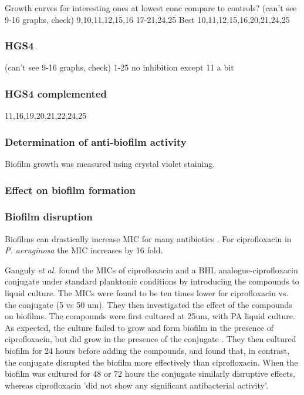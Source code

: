 Growth curves for interesting ones at lowest conc compare to controls?
(can't see 9-16 graphs, check)
9,10,11,12,15,16
17-21,24,25
Best 10,11,12,15,16,20,21,24,25

\subsubsection{HGS4}
(can't see 9-16 graphs, check)
1-25 no inhibition
except 11 a bit


\subsubsection{HGS4 complemented}

11,16,19,20,21,22,24,25

\subsubsection{Determination of anti-biofilm activity}

Biofilm growth was measured using crystal violet staining\cite{OToole1998}.

\subsubsection{Effect on biofilm formation}





\subsubsection{Biofilm disruption}



Biofilms can drastically increase MIC for many antibiotics \cite{Ceri1999}. For ciprofloxacin in \textit{P. aeruginosa} the MIC increases by 16 fold. 

Ganguly \textit{et al.} \cite{Ganguly2011} found the MICs of ciprofloxacin and a BHL analogue-ciprofloxacin  conjugate under standard planktonic conditions by introducing the compounds to liquid culture. The MICs were found to be ten times lower for ciprofloxacin vs. the conjugate  (5 vs 50 um). They then investigated the effect of the compounds on biofilms. The compounds were first cultured at 25um, with PA liquid culture. As expected, the culture failed to grow and form biofilm in the presence of ciprofloxacin, but did grow in the presence of the conjugate . They then cultured biofilm for 24 hours before adding the compounds, and found that, in contrast, the conjugate  disrupted the biofilm more effectively than ciprofloxacin. When the biofilm was cultured for 48 or 72 hours the conjugate similarly disruptive effects, whereas ciprofloxacin 'did not show any significant antibacterial activity'.

